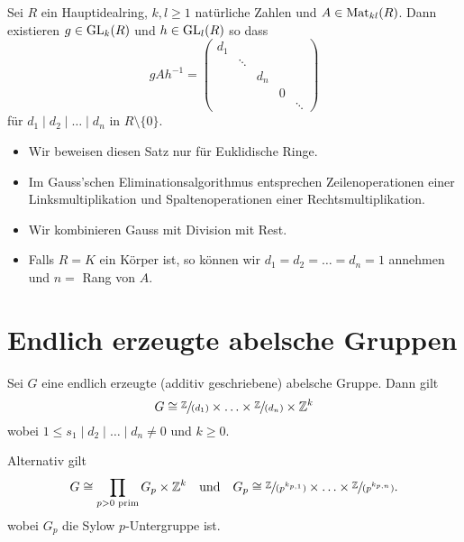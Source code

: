 \begin{theorem}
	Sei $R$ ein Hauptidealring, $k,l \geq 1$ natürliche Zahlen und $A \in \operatorname{Mat}_{kl}(R)$.
	Dann existieren $g \in \operatorname{GL}_{k}(R)$ und $h \in \operatorname{GL}_{l}(R)$ so dass
	\[
	g A h^{-1} = \begin{pmatrix} 
		d_1 \\
		& \ddots \\
		& & d_{n} \\
		& & & 0 \\
		& & & & \ddots
	\end{pmatrix} 
	\]
	für $d_1 \mid d_2 \mid \ldots \mid d_{n}$ in $R \setminus \{0\} $.
\end{theorem}

\begin{itemize}
	\item Wir beweisen diesen Satz nur für Euklidische Ringe.
	\item Im Gauss'schen Eliminationsalgorithmus entsprechen Zeilenoperationen einer Linksmultiplikation und Spaltenoperationen einer Rechtsmultiplikation.
	\item Wir kombinieren Gauss mit Division mit Rest.
	\item Falls $R = K$ ein Körper ist, so können wir $d_1 = d_2 = \ldots = d_{n} = 1$ annehmen und $n = $ Rang von  $A$.
\end{itemize}



\section{Endlich erzeugte abelsche Gruppen}
\begin{theorem}
	Sei $G$ eine endlich erzeugte (additiv geschriebene) abelsche Gruppe.
	Dann gilt
	\[
		G \cong \sfrac{\mathbb{Z}}{(d_1)} \times \ldots \times \sfrac{\mathbb{Z}}{(d_{n})} \times \mathbb{Z}^{k}
	\] 
	wobei $1 \leq s_1 \mid d_2 \mid \ldots \mid d_{n} \neq 0$ und $k \geq 0$.
	
	Alternativ gilt
	\[
		G \cong \prod_{p > 0 \text{ prim}} G_{p} \times \Z^{k} \qq{und} G_{p} \cong \sfrac{\Z}{(p^{k_{p,1}})} \times \ldots \times \sfrac{\Z}{(p^{k_{p,n}})}
	.\] 
	wobei $G_{p}$ die Sylow $p$-Untergruppe ist.
\end{theorem}



